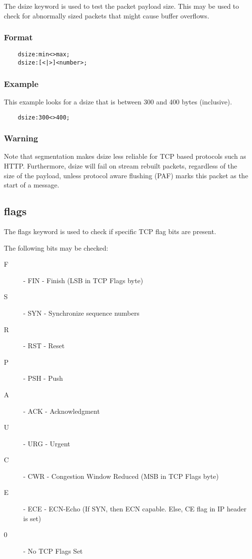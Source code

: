 \documentclass[english]{report}
\begin{document}
The dsize keyword is used to test the packet payload size.  This may be used to
check for abnormally sized packets that might cause buffer overflows.

\subsubsection{Format}

\begin{verbatim}
    dsize:min<>max;
    dsize:[<|>]<number>;
\end{verbatim}

\subsubsection{Example}

This example looks for a dsize that is between 300 and 400 bytes (inclusive).

\begin{verbatim}
    dsize:300<>400;
\end{verbatim}

\subsubsection{Warning}

Note that segmentation makes dsize less reliable for TCP based protocols such
as HTTP.  Furthermore, dsize will fail on stream rebuilt packets, regardless of
the size of the payload, unless protocol aware flushing (PAF) marks this packet
as the start of a message.

\subsection{flags}

The flags keyword is used to check if specific TCP flag bits are present.

The following bits may be checked:

\begin{description}
\item [F] - FIN - Finish (LSB in TCP Flags byte)
\item [S] - SYN - Synchronize sequence numbers
\item [R] - RST - Reset
\item [P] - PSH - Push
\item [A] - ACK - Acknowledgment
\item [U] - URG - Urgent
\item [C] - CWR - Congestion Window Reduced (MSB in TCP Flags byte)
\item [E] - ECE - ECN-Echo (If SYN, then ECN capable.  Else, CE flag in IP header is set)
\item [0] - No TCP Flags Set
\end{description}
\end{document}
